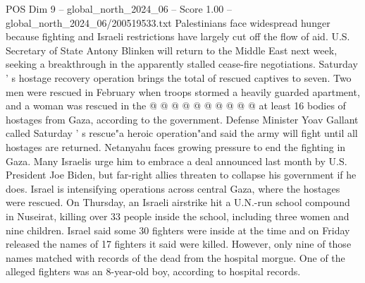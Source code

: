 \begin{textsample}{POS Dim 9 – global\_north\_2024\_06 – Score 1.00 – global\_north\_2024\_06/200519533.txt}
Palestinians face widespread hunger because fighting and Israeli restrictions have largely cut off the flow of aid.
U.S.
Secretary of State Antony Blinken will return to the Middle East next week, seeking a breakthrough in the apparently stalled cease-fire negotiations.
Saturday ' s hostage recovery operation brings the total of rescued captives to seven.
Two men were rescued in February when troops stormed a heavily guarded apartment, and a woman was rescued in the @ @ @ @ @ @ @ @ @ @ at least 16 bodies of hostages from Gaza, according to the government.
Defense Minister Yoav Gallant called Saturday ' s rescue"a heroic operation"and said the army will fight until all hostages are returned.
Netanyahu faces growing pressure to end the fighting in Gaza.
Many Israelis urge him to embrace a deal announced last month by U.S.
President Joe Biden, but far-right allies threaten to collapse his government if he does.
Israel is intensifying operations across central Gaza, where the hostages were rescued.
On Thursday, an Israeli airstrike hit a U.N.-run school compound in Nuseirat, killing over 33 people inside the school, including three women and nine children.
Israel said some 30 fighters were inside at the time and on Friday released the names of 17 fighters it said were killed.
However, only nine of those names matched with records of the dead from the hospital morgue.
One of the alleged fighters was an 8-year-old boy, according to hospital records.

\end{textsample}
